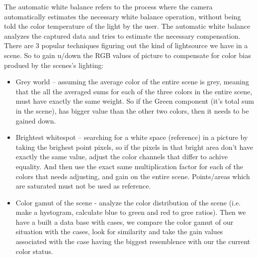 \documentclass{article}
\begin{document}
The automatic white balance refers to the process where the camera automatically estimates the
necessary white balance operation, without being told the color temperature of the light by the user.
The automatic white balance analyzes the captured data and tries to estimate the necessary
compensation. There are 3 popular techniques figuring out the kind of lightsource we have in a scene. 
So to gain u/down the RGB values of picture to compensate for color bias produed by the scenes’s 
lighting:
\begin{itemize}
\item Grey world – assuming the average color of the entire scene is grey, meaning that the all the
averaged sums for each of the three colors in the entire scene, must have exactly the same weight.
So if the Green component (it’s total sum in the scene), has bigger value than the other two colors,
then it needs to be gained down.
\item Brightest whitespot – searching for a white space (reference) in a picture by taking the brighest
point pixels, so if the pixels in that bright area don’t have exactly the same value, adjust the color
channels that differ to achive equality. And then use the exact same multiplication factor for each of
the colors that needs adjusting, and gain on the entire scene. Points/areas which are saturated must
not be used as reference.
\item Color gamut of the scene - analyze the color distribution of the scene (i.e. make a hystogram,
calculate blue to green and red to gree ratios). Then we have a built a data base with cases, we
compare the color gamut of our situation with the cases, look for similarity and take the gain values
associated with the case having the biggest resemblence with our the current color status.
\end{itemize}
\end{document}
